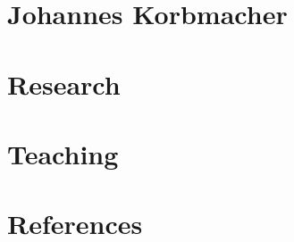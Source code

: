 \documentclass[12pt,a4paper]{article}
\begin{document}
\thispagestyle{empty}
\section*{Johannes Korbmacher}
  
  
\section*{Research}
  
\section*{Teaching}
  
\section*{References}
  \label{last}
  
\end{document}
